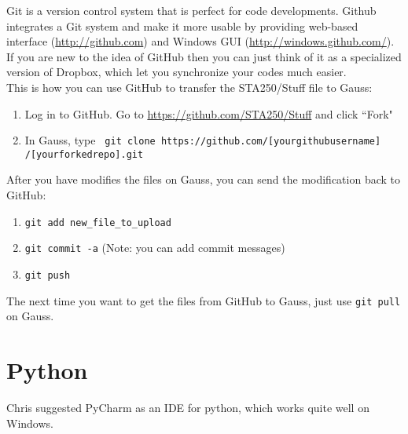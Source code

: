 \documentclass[]{article}
\begin{document}
Git is a version control system that is perfect for code developments. Github integrates a Git system and make it more usable by providing web-based interface (\url{http://github.com}) and Windows GUI (\url{http://windows.github.com/}). If you are new to the idea of GitHub then you can just think of it as a specialized version of Dropbox, which let you synchronize your codes much easier.\\

This is how you can use GitHub to transfer the STA250/Stuff file to Gauss:
\begin{enumerate}
	\item Log in to GitHub. Go to \url{https://github.com/STA250/Stuff} and click ``Fork"
	\item In Gauss, type \texttt{
	git clone https://github.com/[yourgithubusername] /[yourforkedrepo].git}\\
\end{enumerate}

After you have modifies the files on Gauss, you can send the modification back to GitHub:
\begin{enumerate}
	\item \texttt{git add new\_file\_to\_upload}
	\item \texttt{git commit -a} (Note: you can add commit messages)
	\item \texttt{git push}\\
\end{enumerate}

The next time you want to get the files from GitHub to Gauss, just use  \texttt{git pull} on Gauss.

\section{Python}
Chris suggested PyCharm as an IDE for python, which works quite well on Windows.
\end{document}

